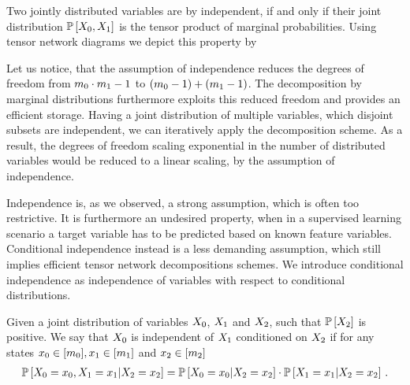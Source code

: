 Two jointly distributed variables are by  independent, if and only if their joint distribution $\mathbb{P}\left[X_{0},X_{1}\right]$ is the tensor product of marginal probabilities.
Using tensor network diagrams we depict this property by
\begin{center}
    
\end{center}
Let us notice, that the assumption of independence reduces the degrees of freedom from $m_{0}\cdot m_{1}-1$ to $(m_{0}-1)+(m_{1}-1)$.
The decomposition by marginal distributions furthermore exploits this reduced freedom and provides an efficient storage.
Having a joint distribution of multiple variables, which disjoint subsets are independent, we can iteratively apply the decomposition scheme.
As a result, the degrees of freedom scaling exponential in the number of distributed variables would be reduced to a linear scaling, by the assumption of independence.

Independence is, as we observed, a strong assumption, which is often too restrictive.
It is furthermore an undesired property, when in a supervised learning scenario a target variable has to be predicted based on known feature variables.
Conditional independence instead is a less demanding assumption, which still implies efficient tensor network decompositions schemes.
We introduce conditional independence as independence of variables with respect to conditional distributions.

\begin{definition}
    \label{def:condIndependence}
    Given a joint distribution of variables $X_{0}$, $X_{1}$ and $X_{2}$, such that $\mathbb{P}\left[X_{2}\right]$ is positive.
    We say that $X_{0}$ is independent of $X_{1}$ conditioned on $X_{2}$ if for any states $x_{0}\in[m_{0}],x_{1}\in[m_{1}]$ and $x_{2}\in[m_{2}]$
    \begin{align*}
        \mathbb{P}\left[X_{0}=x_{0},X_{1}=x_{1}|X_{2}=x_{2}\right]
        = \mathbb{P}\left[X_{0}=x_{0}|X_{2}=x_{2}\right]
        \cdot \mathbb{P}\left[X_{1}=x_{1}|X_{2}=x_{2}\right]   \, .
    \end{align*}
\end{definition}

